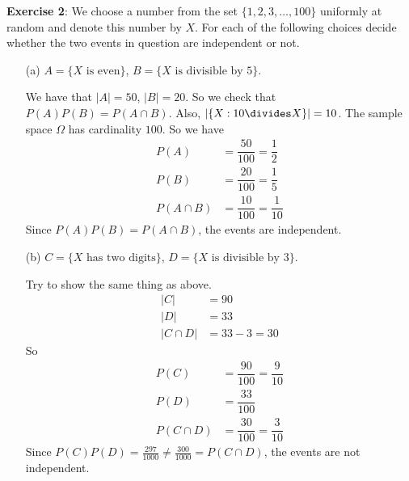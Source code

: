 \documentclass{article}
\begin{document}
\textbf{Exercise 2}: We choose a number from the set $\{1, 2, 3, \ldots, 100\}$ uniformly at random and denote this number by $X$. For each of the following choices decide whether the two events in question are independent or not.
    \begin{itemize}
        \item [(a)] $A = \{X \text{ is even}\}$, $B = \{X \text{ is divisible by $5$}\}$.
            \begin{answer}
                We have that $\lvert A \rvert = 50$, $\lvert B \rvert = 20$. So we check that $P(A)P(B) = P(A \cap B)$. Also, $\lvert \{X : 10 \divides X\} \rvert = 10$. The sample space $\Omega$ has cardinality $100$. So we have 
                    \begin{align*}
                        P(A)        &= \dfrac{50}{100} = \dfrac{1}{2}  \\
                        P(B)        &= \dfrac{20}{100} = \dfrac{1}{5}  \\
                        P(A \cap B) &= \dfrac{10}{100} = \dfrac{1}{10}   
                    \end{align*}
                Since $P(A)P(B) = P(A \cap B)$, the events are independent.
            \end{answer}

        \item [(b)] $C = \{X \text{ has two digits}\}$, $D = \{X \text{ is divisible by } 3\}$.
            \begin{answer}
                Try to show the same thing as above. 
                    \begin{align*}
                        \lvert C \rvert &= 90 \\
                        \lvert D \rvert &= 33 \\
                        \lvert C \cap D \rvert &= 33 - 3 = 30
                    \end{align*}
                So 
                    \begin{align*}
                        P(C)        &= \dfrac{90}{100} = \dfrac{9}{10} \\
                        P(D)        &= \dfrac{33}{100}                 \\
                        P(C \cap D) &= \dfrac{30}{100} = \dfrac{3}{10}   
                    \end{align*}
                Since $P(C)P(D) = \frac{297}{1000} \neq \frac{300}{1000} = P(C \cap D)$, the events are not independent.
            \end{answer}


\end{itemize}
\end{document}
